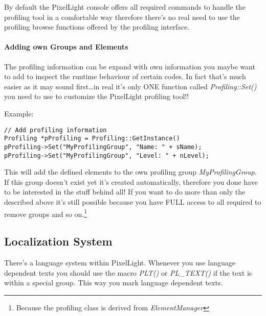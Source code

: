 By default the PixelLight console offers all required commands to handle the profiling tool in a comfortable way therefore there's no real need to use the profiling browse functions offered by the profiling interface.


\paragraph{Adding own Groups and Elements}
The profiling information can be expand with own information you maybe want to add to inspect the runtime behaviour of certain codes. In fact that's much easier as it may sound first\ldots in real it's only ONE function called \emph{Profiling::Set()} you need to use to customize the PixelLight profiling tool!!

Example:

\begin{lstlisting}[caption=Profiling usage example]
// Add profiling information
Profiling *pProfiling = Profiling::GetInstance()
pProfiling->Set("MyProfilingGroup", "Name: " + sName);
pProfiling->Set("MyProfilingGroup", "Level: " + nLevel);
\end{lstlisting}

This will add the defined elements to the own profiling group \emph{MyProfilingGroup}. If this group doesn't exist yet it's created automatically, therefore you done have to be interested in the stuff behind all! If you want to do more than only the described above it's still possible because you have FULL access to all required to remove groups and so on.\footnote{Because the profiling class is derived from \emph{ElementManager}}




\subsection{Localization System}
There's a language system within PixelLight. Whenever you use language dependent texts you should use the macro \emph{PLT()} or \emph{PL\_TEXT()} if the text is within a special group. This way you mark language dependent texts.

